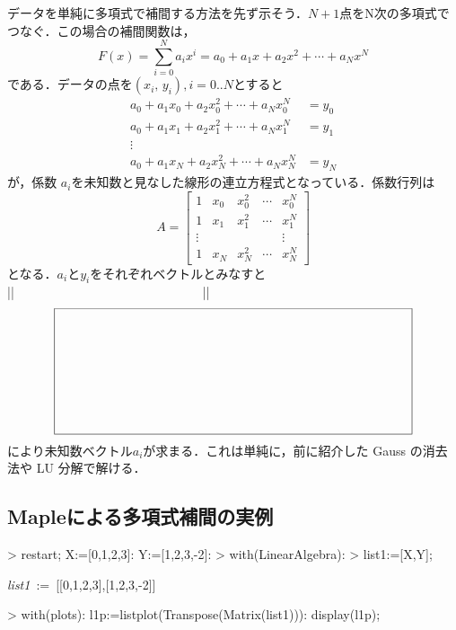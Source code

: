 データを単純に多項式で補間する方法を先ず示そう．$N+1$点をN次の多項式でつなぐ．この場合の補間関数は，
\begin{equation*}
F \left(x \right)={\sum_{i=0}^{N} } a _{i }x ^{i }=a_{0}+a_{1}x +a_{2}x^{2}+\cdots +a_{N}x^{N}
\end{equation*}
である．データの点を$(x_{i},\,y_{i}),i=0..N$とすると
\begin{equation*}
\begin{array}{cl}
a _{0}+a _{1}x _{0}+a _{2}x _{0}^{2}+\cdots +a _{N }x _{0}^{N }& =y _{0}\\
a _{0}+a _{1}x _{1}+a _{2}x _{1}^{2}+\cdots +a _{N }x _{1}^{N }& =y _{1}\\
\vdots& \\
a _{0}+a _{1}x _{N}+a _{2}x _{N}^{2}+\cdots +a _{N }x _{N}^{N }& =y _{N}
\end{array}
\end{equation*}
が，係数 $a_i$を未知数と見なした線形の連立方程式となっている．係数行列は
\begin{equation*}
A=\left[
\begin{array}{ccccc}
1&x_0&x_0^2&\cdots&x_0^N \\
1&x_1&x_1^2&\cdots&x_1^N \\
\vdots& & & & \vdots \\
1&x_N&x_N^2&\cdots&x_N^N 
\end{array} \right]
\end{equation*}
となる．$a_i$と$y_i$をそれぞれベクトルとみなすと
\ifHIKI %
||　　　　　　　　　　　　　　　||
\else %
\begin{equation*}
\setlength{\unitlength}{1cm}
\begin{picture}(10,3.5)
\put(0,0){\framebox(10,3.5){}}
\end{picture}
\end{equation*}
\fi %
により未知数ベクトル$a_i$が求まる．これは単純に，前に紹介した Gauss の消去法や LU 分解で解ける．

\subsection{Mapleによる多項式補間の実例}
\begin{MapleInput}
> restart; X:=[0,1,2,3]: Y:=[1,2,3,-2]:
> with(LinearAlgebra):
> list1:=[X,Y];
\end{MapleInput}
\begin{MapleOutput}
{\it list1}\, := \,[[0,1,2,3],[1,2,3,-2]]
\end{MapleOutput}
\begin{MapleInput}
> with(plots):
  l1p:=listplot(Transpose(Matrix(list1))):
  display(l1p);
\end{MapleInput}

